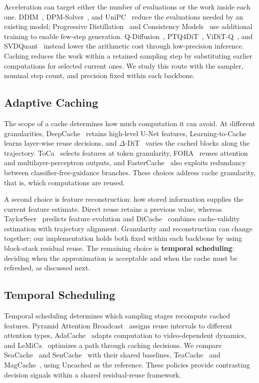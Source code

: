 \documentclass[10pt,twocolumn,letterpaper]{article}
\begin{document}
Acceleration can target either the number of evaluations or the work inside each one.
DDIM~\cite{song2021ddim}, \mbox{DPM-Solver}~\cite{lu2022dpmsolver}, and UniPC~\cite{zhao2023unipc} reduce the evaluations needed by an existing model; Progressive Distillation~\cite{salimans2022progressive} and Consistency Models~\cite{song2023consistency} use additional training to enable few-step generation.
\mbox{Q-Diffusion}~\cite{li2023qdiffusion}, PTQ4DiT~\cite{wu2024ptq4dit}, \mbox{ViDiT-Q}~\cite{zhao2025viditq}, and SVDQuant~\cite{li2025svdquant} instead lower the arithmetic cost through low-precision inference.
Caching reduces the work within a retained sampling step by substituting earlier computations for selected current ones.
We study this route with the sampler, nominal step count, and precision fixed within each backbone.

\subsection{Adaptive Caching}
The scope of a cache determines how much computation it can avoid.
At different granularities, DeepCache~\cite{ma2024deepcache} retains high-level U-Net features, \mbox{Learning-to-Cache}~\cite{ma2024learningtocache} learns layer-wise reuse decisions, and \mbox{$\Delta$-DiT}~\cite{chen2024deltadit} varies the cached blocks along the trajectory.
ToCa~\cite{zou2025toca} selects features at token granularity, FORA~\cite{selvaraju2024fora} reuses attention and multilayer-perceptron outputs, and FasterCache~\cite{lv2024fastercache} also exploits redundancy between classifier-free-guidance branches.
These choices address cache granularity, that is, which computations are reused.

A second choice is feature reconstruction: how stored information supplies the current feature estimate.
Direct reuse retains a previous value, whereas TaylorSeer~\cite{liu2025taylorseer} predicts feature evolution and DiCache~\cite{bu2026dicache} combines cache-validity estimation with trajectory alignment.
Granularity and reconstruction can change together; our implementation holds both fixed within each backbone by using block-stack residual reuse.
The remaining choice is \textbf{temporal scheduling}: deciding when the approximation is acceptable and when the cache must be refreshed, as discussed next.

\subsection{Temporal Scheduling}
Temporal scheduling determines which sampling stages recompute cached features.
Pyramid Attention Broadcast~\cite{zhao2024pab} assigns reuse intervals to different attention types, AdaCache~\cite{kahatapitiya2025adacache} adapts computation to video-dependent dynamics, and LeMiCa~\cite{gao2025lemica} optimizes a path through caching decisions.
We compare SeaCache~\cite{chung2026seacache} and SenCache~\cite{haghighi2026sencache} with their shared baselines, TeaCache~\cite{liu2025teacache} and MagCache~\cite{ma2025magcache}, using Uncached as the reference.
These policies provide contrasting decision signals within a shared residual-reuse framework.
\end{document}

